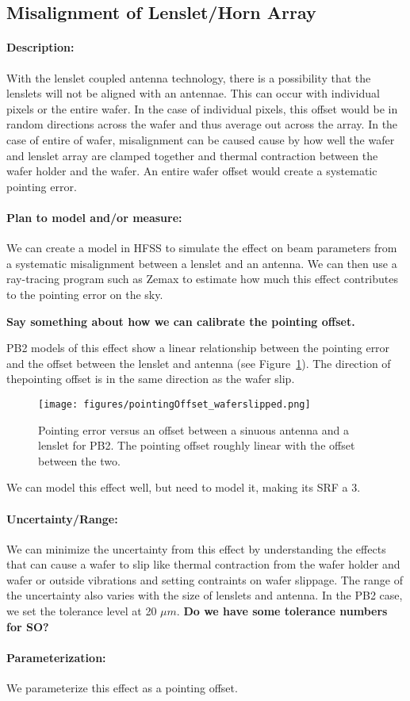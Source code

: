 \subsection{Misalignment of Lenslet/Horn Array}

\paragraph{Description:}
With the lenslet coupled antenna technology, there is a possibility that the lenslets will not be aligned with an antennae. This can occur with individual pixels or the entire wafer. In the case of individual pixels, this offset would be in random directions across the wafer and thus average out across the array. In the case of entire of wafer, misalignment can be caused cause by how well the wafer and lenslet array are clamped together and thermal contraction between the wafer holder and the wafer. An entire wafer offset would create a systematic pointing error.

\paragraph{Plan to model and/or measure:}
We can create a model in HFSS to simulate the effect on beam parameters from a systematic misalignment between a lenslet and an antenna. We can then use a ray-tracing program such as Zemax to estimate how much this effect contributes to the pointing error on the sky.

\textbf{Say something about how we can calibrate the pointing offset.}

PB2 models of this effect show a linear relationship between the pointing error and the offset between the lenslet and antenna (see Figure~\ref{poitingoffsetFromWaferslipped}). The direction of thepointing offset is in the same direction as the wafer slip. 
  
\begin{figure}
\centering
\texttt{[image: figures/pointingOffset\_waferslipped.png]}
\caption{Pointing error versus an offset between a sinuous antenna and a lenslet for PB2. The pointing offset roughly linear with the offset between the two.}
\label{poitingoffsetFromWaferslipped}
\end{figure}


We can model this effect well, but need to model it, making its SRF a 3.

\paragraph{Uncertainty/Range:}
We can minimize the uncertainty from this effect by understanding the effects that can cause a wafer to slip like thermal contraction from the wafer holder and wafer or outside vibrations and setting contraints on wafer slippage. The range of the uncertainty also varies with the size of lenslets and antenna. In the PB2 case, we set the tolerance level at 20 $\mu m$. \textbf{Do we have some tolerance numbers for SO?}

\paragraph{Parameterization:}
We parameterize this effect as a pointing offset.
